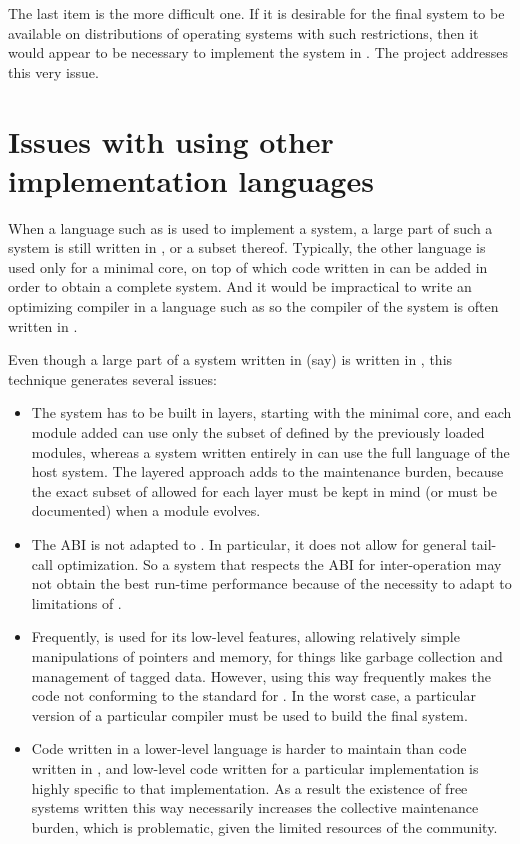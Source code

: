 The last item is the more difficult one.  If it is desirable for the
final \commonlisp{} system to be available on distributions of
operating systems with such restrictions, then it would appear to be
necessary to implement the system in \clanguage{}.  The \sysname{}
project addresses this very issue.

\section{Issues with using other implementation languages}

When a language such as \clanguage{} is used to implement a
\commonlisp{} system, a large part of such a system is still written
in \commonlisp{}, or a subset thereof.  Typically, the other language
is used only for a minimal core, on top of which code written in
\commonlisp{} can be added in order to obtain a complete system.  And
it would be impractical to write an optimizing \commonlisp{} compiler
in a language such as \clanguage{} so the compiler of the system is
often written in \commonlisp{}.

Even though a large part of a \commonlisp{} system written in (say)
\clanguage{} is written in \commonlisp{}, this technique generates
several issues:

\begin{itemize}
\item The system has to be built in layers, starting with the minimal
  core, and each module added can use only the subset of \commonlisp{}
  defined by the previously loaded modules, whereas a system written
  entirely in \commonlisp{} can use the full \commonlisp{} language of
  the host \commonlisp{} system.  The layered approach adds to the
  maintenance burden, because the exact subset of \commonlisp{}
  allowed for each layer must be kept in mind (or must be documented)
  when a module evolves.
\item The \clanguage{} ABI is not adapted to \commonlisp{}.  In
  particular, it does not allow for general tail-call optimization.
  So a system that respects the \clanguage{} ABI for inter-operation
  may not obtain the best run-time performance because of the
  necessity to adapt to limitations of \clanguage{}.
\item Frequently, \clanguage{} is used for its low-level features,
  allowing relatively simple manipulations of pointers and memory, for
  things like garbage collection and management of tagged data.
  However, using \clanguage{} this way frequently makes the code
  not conforming to the standard for \clanguage{}.  In the worst case,
  a particular version of a particular \clanguage{} compiler must be
  used to build the final \commonlisp{} system.
\item Code written in a lower-level language is harder to maintain
  than code written in \commonlisp{}, and low-level code written for a
  particular \commonlisp{} implementation is highly specific to that
  implementation.  As a result the existence of free \commonlisp{}
  systems written this way necessarily increases the collective
  maintenance burden, which is problematic, given the limited
  resources of the \commonlisp{} community.
\end{itemize}

